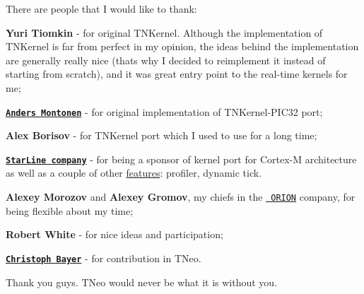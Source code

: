 There are people that I would like to thank\+:


\begin{DoxyItemize}
\item {\bfseries{Yuri Tiomkin}} -\/ for original T\+N\+Kernel. Although the implementation of T\+N\+Kernel is far from perfect in my opinion, the ideas behind the implementation are generally really nice (that\textquotesingle{}s why I decided to reimplement it instead of starting from scratch), and it was great entry point to the real-\/time kernels for me;
\item \href{https://github.com/andersm}{\texttt{ {\bfseries{Anders Montonen}}}} -\/ for original implementation of T\+N\+Kernel-\/\+P\+I\+C32 port;
\item {\bfseries{Alex Borisov}} -\/ for T\+N\+Kernel port which I used to use for a long time;
\item \href{http://starline.ru}{\texttt{ {\bfseries{Star\+Line company}}}} -\/ for being a sponsor of kernel port for Cortex-\/M architecture as well as a couple of other \mbox{\hyperlink{features}{features}}\+: profiler, dynamic tick.
\item {\bfseries{Alexey Morozov}} and {\bfseries{Alexey Gromov}}, my chiefs in the \href{http://orionspb.ru/}{\texttt{ O\+R\+I\+ON}} company, for being flexible about my time;
\item {\bfseries{Robert White}} -\/ for nice ideas and participation;
\item \href{https://bitbucket.org/chrbayer}{\texttt{ {\bfseries{Christoph Bayer}}}} -\/ for contribution in T\+Neo.
\end{DoxyItemize}

Thank you guys. T\+Neo would never be what it is without you. 
